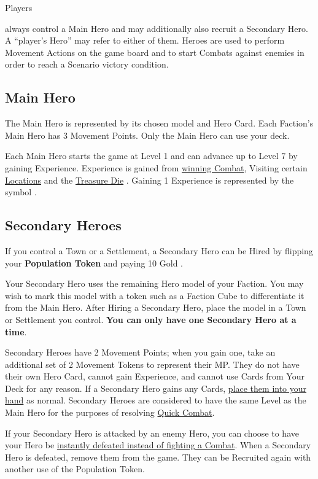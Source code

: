 
\begin{multicols*}{2}

\hypertarget{Heroes}{Players} always control a Main Hero and may additionally also recruit a Secondary Hero.
A “player's Hero” may refer to either of them.
Heroes are used to perform Movement Actions on the game board and to start Combats against enemies in order to reach a Scenario victory condition.

\subsection*{Main Hero}
The Main Hero is represented by its chosen model and Hero Card.
Each Faction's Main Hero has 3 Movement Points.
Only the Main Hero can use your deck.\par
Each Main Hero starts the game at Level 1 and can advance up to Level 7 by gaining Experience.
Experience is gained from \hyperlink{Combatexperience}{winning Combat}, Visiting certain \hyperlink{All}{Locations} and the \hyperlink{Resources}{Treasure Die} .
Gaining 1 Experience is represented by the symbol .

\subsection*{\hypertarget{Secondary}{Secondary Heroes}}
If you control a Town or a Settlement, a Secondary Hero can be Hired by flipping your \textbf{Population Token} and paying 10 Gold .\par
{}\par
Your Secondary Hero uses the remaining Hero model of your Faction.
You may wish to mark this model with a token such as a Faction Cube to differentiate it from the Main Hero.
After Hiring a Secondary Hero, place the model in a Town or Settlement you control.
\textbf{You can only have one Secondary Hero at a time}.\par
Secondary Heroes have 2 Movement Points; when you gain one, take an additional set of 2 Movement Tokens to represent their MP.
They do not have their own Hero Card, cannot gain Experience, and cannot use Cards from Your Deck for any reason.
If a Secondary Hero gains any Cards, \hyperlink{Playerdecks}{place them into your hand} as normal.
Secondary Heroes are considered to have the same Level as the Main Hero for the purposes of resolving \hyperlink{Quick}{Quick Combat}.\par
If your Secondary Hero is attacked by an enemy Hero, you can choose to have your Hero be \hyperlink{Endcombat}{instantly defeated instead of fighting a Combat}.
When a Secondary Hero is defeated, remove them from the game.
They can be Recruited again with another use of the Population Token.\par


\end{multicols*}
